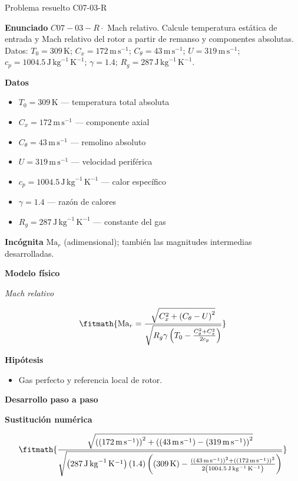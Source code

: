 \documentclass[10pt,openany]{book}
\begin{document}
\begin{studiumworked}{Problema resuelto C07-03-R}


\noindent\textbf{Enunciado}
\(C07-03-R \cdot\) Mach relativo. Calcule temperatura estática de entrada y Mach relativo del rotor a partir de remanso y componentes absolutas. Datos: \(T_0=309\, \mathrm{K}\); \(C_x=172\, \mathrm{m}\,\mathrm{s}^{-1}\); \(C_\theta=43\, \mathrm{m}\,\mathrm{s}^{-1}\); \(U=319\, \mathrm{m}\,\mathrm{s}^{-1}\); \(c_p=1004.5\, \mathrm{J}\,\mathrm{kg}^{-1}\,\mathrm{K}^{-1}\); \(\gamma=1.4\); \(R_g=287\, \mathrm{J}\,\mathrm{kg}^{-1}\,\mathrm{K}^{-1}\).

\noindent\textbf{Datos}
\begin{itemize}
\item $T_0 = 309\,\mathrm{K}$ — temperatura total absoluta
\item $C_x = 172\,\mathrm{m}\,\mathrm{s}^{-1}$ — componente axial
\item $C_\theta = 43\,\mathrm{m}\,\mathrm{s}^{-1}$ — remolino absoluto
\item $U = 319\,\mathrm{m}\,\mathrm{s}^{-1}$ — velocidad periférica
\item $c_p = 1004.5\,\mathrm{J}\,\mathrm{kg}^{-1}\,\mathrm{K}^{-1}$ — calor específico
\item $\gamma = 1.4$ — razón de calores
\item $R_g = 287\,\mathrm{J}\,\mathrm{kg}^{-1}\,\mathrm{K}^{-1}$ — constante del gas
\end{itemize}

\noindent\textbf{Incógnita}
$\mathrm{Ma}_r$ (adimensional); también las magnitudes intermedias desarrolladas.

\noindent\textbf{Modelo físico}

\noindent\textit{Mach relativo}

\[
\fitmath{\mathrm{Ma}_r=\frac{\sqrt{C_x^{2} + \left(C_\theta - U\right)^{2}}}{\sqrt{R_g \gamma \left(T_0 - \frac{C_\theta^{2} + C_x^{2}}{2 c_p}\right)}}}
\]

\noindent\textbf{Hipótesis}
\begin{itemize}
\item Gas perfecto y referencia local de rotor.
\end{itemize}

\noindent\textbf{Desarrollo paso a paso}



\noindent\textbf{Sustitución numérica}

\[
\fitmath{\frac{\sqrt{\left(\left(172\,\mathrm{m}\,\mathrm{s}^{-1}\right)\right)^{2} + \left(\left(43\,\mathrm{m}\,\mathrm{s}^{-1}\right) - \left(319\,\mathrm{m}\,\mathrm{s}^{-1}\right)\right)^{2}}}{\sqrt{\left(287\,\mathrm{J}\,\mathrm{kg}^{-1}\,\mathrm{K}^{-1}\right) \left(1.4\right) \left(\left(309\,\mathrm{K}\right) - \frac{\left(\left(43\,\mathrm{m}\,\mathrm{s}^{-1}\right)\right)^{2} + \left(\left(172\,\mathrm{m}\,\mathrm{s}^{-1}\right)\right)^{2}}{2 \left(1004.5\,\mathrm{J}\,\mathrm{kg}^{-1}\,\mathrm{K}^{-1}\right)}\right)}}}
\]


\end{studiumworked}
\end{document}
